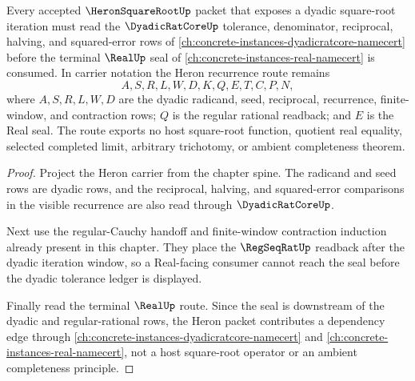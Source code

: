 \begin{theorem}
\label{thm:heron-square-root-dyadicratcore-anchor}
Every accepted $\HeronSquareRootUp$ packet that exposes a dyadic square-root iteration must read the $\DyadicRatCoreUp$ tolerance, denominator, reciprocal, halving, and squared-error rows of \autoref{ch:concrete-instances-dyadicratcore-namecert} before the terminal $\RealUp$ seal of \autoref{ch:concrete-instances-real-namecert} is consumed. In carrier notation the Heron recurrence route remains
$$
A,S,R,L,W,D,K,Q,E,T,C,P,N ,
$$
where $A,S,R,L,W,D$ are the dyadic radicand, seed, reciprocal, recurrence, finite-window, and contraction rows; $Q$ is the regular rational readback; and $E$ is the Real seal. The route exports no host square-root function, quotient real equality, selected completed limit, arbitrary trichotomy, or ambient completeness theorem.
\end{theorem}
\begin{proof}
Project the Heron carrier from the chapter spine. The radicand and seed rows are dyadic rows, and the reciprocal, halving, and squared-error comparisons in the visible recurrence are also read through $\DyadicRatCoreUp$.

Next use the regular-Cauchy handoff and finite-window contraction induction already present in this chapter. They place the $\RegSeqRatUp$ readback after the dyadic iteration window, so a Real-facing consumer cannot reach the seal before the dyadic tolerance ledger is displayed.

Finally read the terminal $\RealUp$ route. Since the seal is downstream of the dyadic and regular-rational rows, the Heron packet contributes a dependency edge through \autoref{ch:concrete-instances-dyadicratcore-namecert} and \autoref{ch:concrete-instances-real-namecert}, not a host square-root operator or an ambient completeness principle.
\end{proof}

